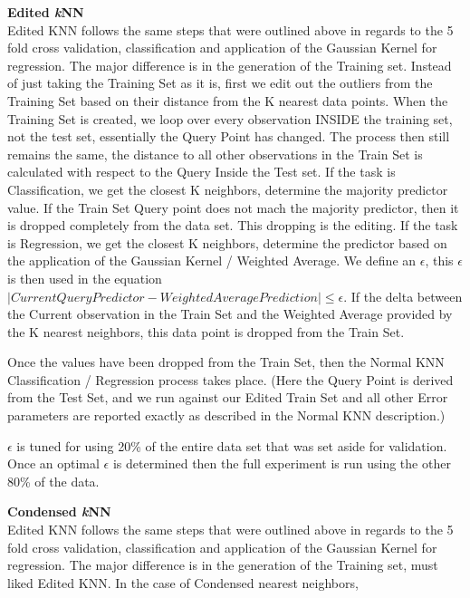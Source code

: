 \documentclass[twoside,11pt]{article}
\begin{document}
\textbf{Edited \textit{k}NN}\\
\hspace*{10mm} Edited KNN follows the same steps that were outlined above in regards to the 5 fold cross validation, classification and application of the Gaussian Kernel for regression. The major difference is in the generation of the Training set. Instead of just taking the Training Set as it is, first we edit out the outliers from the Training Set based on their distance from the K nearest data points. 
When the Training Set is created, we loop over every observation INSIDE the training set, not the test set, essentially the Query Point has changed. The process then still remains the same, the distance to all other observations in the Train Set is calculated with respect to the Query Inside the Test set.\newline 
If the task is Classification, we get the closest K neighbors, determine the majority predictor value. If the Train Set Query point does not mach the majority predictor, then it is dropped completely from the data set. This dropping is the editing. 
If the task is Regression, we get the closest K neighbors, determine the predictor based on the application of the Gaussian Kernel / Weighted Average. We define an $\epsilon$, this $\epsilon$ is then used in the equation $|Current Query Predictor - Weighted Average Prediction| \leq \epsilon$.\newline
If the delta between the Current observation in the Train Set and the Weighted Average provided by the K nearest neighbors, this data point is dropped from the Train Set.\newline

Once the values have been dropped from the Train Set, then the Normal KNN Classification / Regression process takes place. (Here the Query Point is derived from the Test Set, and we run against our Edited Train Set and all other Error parameters are reported exactly as described in the Normal KNN description.)\newline

$\epsilon$ is tuned for using 20\% of the entire data set that was set aside for validation. Once an optimal $\epsilon$ is determined then the full experiment is run using the other 80\% of the data.

\textbf{Condensed \textit{k}NN}\\
\hspace*{10mm} Edited KNN follows the same steps that were outlined above in regards to the 5 fold cross validation, classification and application of the Gaussian Kernel for regression. The major difference is in the generation of the Training set, must liked Edited KNN. In the case of Condensed nearest neighbors, 
\end{document}
